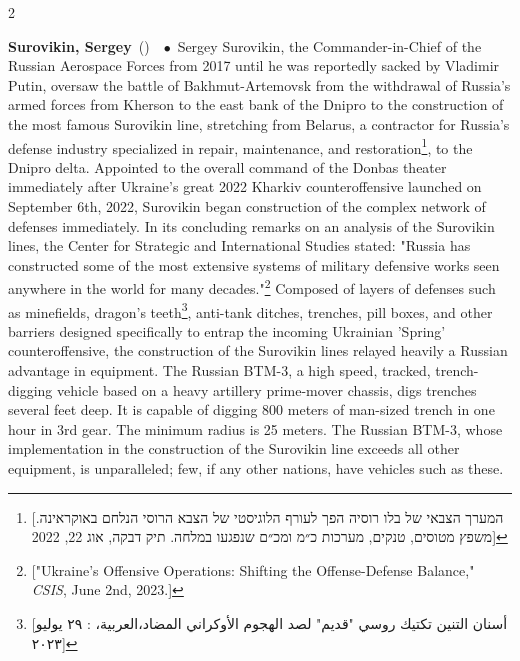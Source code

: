 \documentclass[10pt,a4paper,twoside]{article} %
\newcommand{\entry}[4]{\markboth{#1}{#1}\textbf{#1}\ {(#2)}\ \textit{#3}\ $\bullet$\ {#4}}  %
\begin{document}
\begin{multicols}{2}
{\entry{Surovikin, Sergey} {} {} {Sergey Surovikin, the Commander-in-Chief of the Russian Aerospace Forces from 2017 until he was reportedly sacked by Vladimir Putin, oversaw the battle of Bakhmut-Artemovsk from the withdrawal of Russia's armed forces from Kherson to the east bank of the Dnipro to the construction of the most famous Surovikin line, stretching from Belarus, a contractor for Russia's defense industry specialized in repair, maintenance, and restoration\footnote{[\texthebrew{המערך הצבאי של בלו רוסיה הפך לעורף הלוגיסטי של הצבא הרוסי הנלחם באוקראינה. משפץ מטוסים, טנקים, מערכות כ״מ ומכ״ם שנפגעו במלחה. תיק דבקה, אוג 22, 2022}]}, to the Dnipro delta. Appointed to the overall command of the Donbas theater immediately after Ukraine's great 2022 Kharkiv counteroffensive launched on September 6th, 2022, Surovikin began construction of the complex network of defenses immediately. In its concluding remarks on an analysis of the Surovikin lines, the Center for Strategic and International Studies stated: "Russia has constructed some of the most extensive systems of military defensive works seen anywhere in the world for many decades."\footnote{["Ukraine’s Offensive Operations: Shifting the Offense-Defense Balance," \emph{CSIS}, June 2nd, 2023.]} Composed of layers of defenses such as minefields, dragon's teeth\footnote{[\textarabic{أسنان التنين تكتيك روسي "قديم" لصد الهجوم الأوكراني المضاد،العربية،  : ٢٩ يوليو ٢٠٢٣}]}, anti-tank ditches, trenches, pill boxes, and other barriers designed specifically to entrap the incoming Ukrainian 'Spring' counteroffensive, the construction of the Surovikin lines relayed heavily a Russian advantage in equipment. The Russian BTM-3, a high speed, tracked, trench-digging vehicle based on a heavy artillery prime-mover chassis, digs trenches several feet deep. It is capable of digging 800 meters of man-sized trench in one hour in 3rd gear. The minimum radius is 25 meters. The Russian BTM-3, whose implementation in the construction of the Surovikin line exceeds all other equipment, is unparalleled; few, if any other nations, have vehicles such as these. 
}}
\end{multicols}
\end{document}
